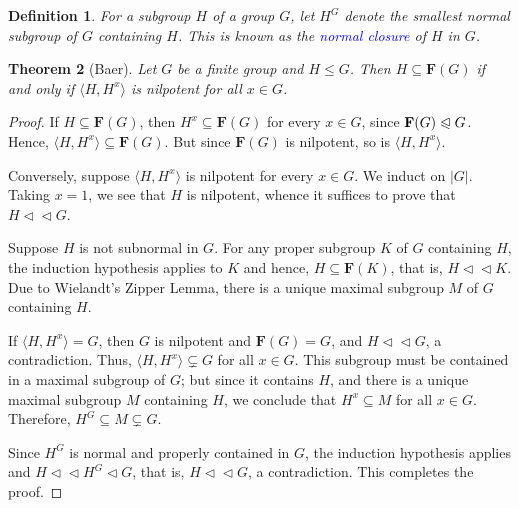 \documentclass[12pt]{article}
\theoremstyle{thmstyle}
\newtheorem{theorem}{Theorem}[section]
\theoremstyle{defstyle}
\newtheorem{definition}[theorem]{Definition}
\newcommand{\define}[1]{\textcolor{blue}{\textit{#1}}}
\renewcommand{\le}{\leqslant}
\newcommand{\bfF}{\mathbf{F}} %
\newcommand{\nor}{\vartriangleleft}
\newcommand{\noreq}{\trianglelefteqslant}
\newcommand{\subnor}{\nor\!\nor}
\begin{document}
\begin{definition}
    For a subgroup $H$ of a group $G$, let $H^G$ denote the smallest normal subgroup of $G$ containing $H$. This is known as the \define{normal closure} of $H$ in $G$.
\end{definition}

\begin{theorem}[Baer]
    Let $G$ be a finite group and $H\le G$. Then $H\subseteq\bfF(G)$ if and only if $\langle H, H^x\rangle$ is nilpotent for all $x\in G$.
\end{theorem}
\begin{proof}
    If $H\subseteq\bfF(G)$, then $H^x\subseteq\bfF(G)$ for every $x\in G$, since $\bfF(G)\noreq G$. Hence, $\langle H, H^x\rangle\subseteq\bfF(G)$. But since $\bfF(G)$ is nilpotent, so is $\langle H, H^x\rangle$.

    Conversely, suppose $\langle H, H^x\rangle$ is nilpotent for every $x\in G$. We induct on $|G|$. Taking $x = 1$, we see that $H$ is nilpotent, whence it suffices to prove that $H\subnor G$. 

    Suppose $H$ is not subnormal in $G$. For any proper subgroup $K$ of $G$ containing $H$, the induction hypothesis applies to $K$ and hence, $H\subseteq\bfF(K)$, that is, $H\subnor K$. Due to Wielandt's Zipper Lemma, there is a unique maximal subgroup $M$ of $G$ containing $H$.

    If $\langle H, H^x\rangle = G$, then $G$ is nilpotent and $\bfF(G) = G$, and $H\subnor G$, a contradiction. Thus, $\langle H, H^x\rangle\subsetneq G$ for all $x\in G$. This subgroup must be contained in a maximal subgroup of $G$; but since it contains $H$, and there is a unique maximal subgroup $M$ containing $H$, we conclude that $H^x\subseteq M$ for all $x\in G$. Therefore, $H^G\subseteq M\subsetneq G$. 

    Since $H^G$ is normal and properly contained in $G$, the induction hypothesis applies and $H\subnor H^G\nor G$, that is, $H\subnor G$, a contradiction. This completes the proof.
\end{proof}
\end{document}

